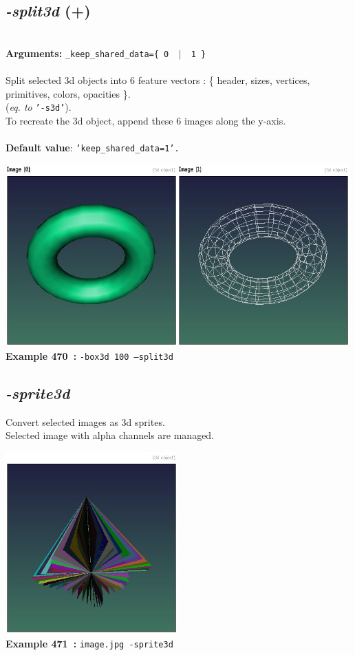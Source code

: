 \documentclass[a4paper,11pt,twoside]{book}
\begin{document}
\subsection{\emph{-split3d} (+)}\vspace*{-0.5em}
~\\\textbf{Arguments: } 
{\small \texttt{\_keep\_shared\_data=\{ 0 ~$|$~ 1 \}}}\\~\\
Split selected 3d objects into 6 feature vectors :
\{ header, sizes, vertices, primitives, colors, opacities \}.
~\\(\emph{eq. to} {\small \texttt{'-s3d'}}).
~\\To recreate the 3d object, append these 6 images along the y-axis.
~\\~\\\textbf{Default value}: {\small \texttt{'keep\_shared\_data=1'.}}
\begin{center}\includegraphics[keepaspectratio=true,height=7cm,width=\textwidth]{img/gmic_def470.jpg}\\
{\footnotesize \textbf{Example 470~:} \texttt{-box3d 100 --split3d}}
\end{center}

\subsection{\emph{-sprite3d} }\vspace*{-0.5em}
Convert selected images as 3d sprites.
~\\Selected image with alpha channels are managed.
\begin{center}\includegraphics[keepaspectratio=true,height=7cm,width=\textwidth]{img/gmic_def471.jpg}\\
{\footnotesize \textbf{Example 471~:} \texttt{image.jpg -sprite3d}}
\end{center}
\end{document}
